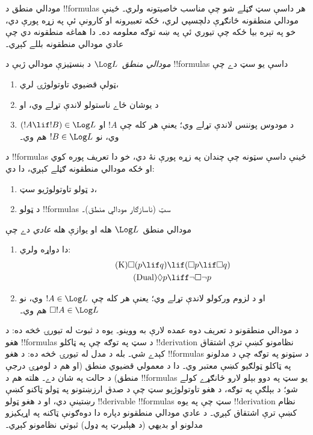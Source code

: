 \documentclass[../../../include/open-logic-section]{subfiles}
\begin{document}


مودالي منطق د !!{formula}s هر داسې سټ ګڼلے شو چې مناسب خاصيتونه ولري۔ ځينې مودالي منطقونه ځانګړې دلچسپي لري، ځکه تعبيرونه او کارونې ئې په زړه پورې دي، خو په تېره بيا ځکه چې تيوري ئې په ښه توګه معلومه ده۔ دا هماغه منطقونه دي چې عادي مودالي منطقونه بللے کېږي۔

\begin{defn}
\emph{مودالي منطق}~$\Log L$ د بنسټيزې مودالي ژبې د !!{formula}s داسې يو سټ دے چې
\begin{enumerate}
\item ټولې قضيوي تاوتولوژۍ لري،
\item د يو‌شان ځاے ناستولو لاندې تړلے وي، او
\item د مودوس پوننس لاندې تړلے وي؛ يعنې هر کله چې $!A$ او $(!A \lif
  !B) \in \Log L$ وي، نو $!B \in \Log L$ هم وي۔
\end{enumerate}
\end{defn}

\begin{ex}
د !!{formula}s ځينې داسې سټونه چې چندان په زړه پورې نۀ دي، خو دا تعريف پوره کوي او ځکه مودالي منطقونه ګڼلے کېږي، دا دي:
\begin{enumerate}
\item د ټولو تاوتولوژيو سټ،
\item د ټولو !!{formula}s سټ (ناسازګار مودالي منطق)۔
\end{enumerate}
\end{ex}

\begin{defn}\label{defn:normal-modal-logic}
مودالي منطق~$\Log L$ هله او يوازې هله \emph{عادي} دے چې
\begin{enumerate}
\item دا دواړه ولري:
\begin{align}
\tag{K} \Box(p \lif q) & \lif (\Box p \lif \Box q) \\
\tag{Dual} \Diamond p & \liff \lnot \Box \lnot p
\end{align}
\item او د لزوم ورکولو لاندې تړلے وي؛ يعنې هر کله چې $!A \in
  \Log L$ وي، نو $\Box !A \in \Log L$ هم وي۔
\end{enumerate}
\end{defn}

د مودالي منطقونو د تعريف دوه عمده لارې به ووينو۔ يوه د ثبوت له تيورۍ څخه ده: د هغو !!{formula}s د سټ په توګه چې په ټاکلو !!{derivation} نظامونو کښې ترې اشتقاق کېدے شي۔ بله د مدل له تيورۍ څخه ده: د هغو !!{formula}s د سټونو په توګه چې د مدلونو په ټاکلو ټولګيو کښې معتبر وي۔ دا د معمولي قضيوي منطق (او هم د لومړۍ درجې منطق) د حالت په شان دے۔ هلته هم د !!{formula}s يو سټ په دوو بېلو لارو ځانګړے کولے شو؛ د بېلګې په توګه، د هغو تاوتولوژيو سټ چې د صدق ارزښتونو په ټولو ټاکنو کښې رښتينې دي، او د هغو ټولو !!{derivable} !!{formula}s سټ چې په يوه !!{derivation} نظام کښې ترې اشتقاق کېږي۔ د عادي مودالي منطقونو دپاره دا دوه‌ګونې ټاکنه په اړيکيزو مدلونو او بديهي (د هېلبرټ په ډول) ثبوتي نظامونو کېږي۔
\end{document}

